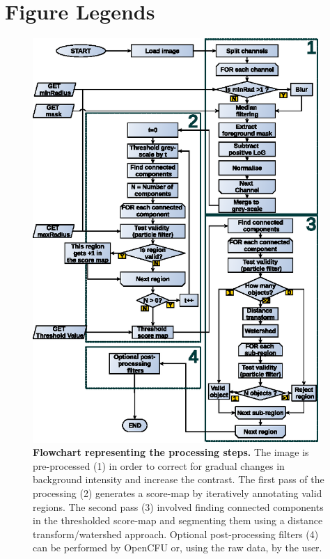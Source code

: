 \documentclass[10pt]{article}
\begin{document}
\section*{Figure Legends} 

\begin{figure}[!ht]
\begin{center}
\includegraphics[width=4.27in]{./figPipeline/figFlowChart.eps}
\end{center}
\caption{{\bf Flowchart representing the processing steps.}
The image is pre-processed (1) in order to correct for gradual
changes in background intensity and increase the contrast.
The first pass of the processing (2) generates a score-map by iteratively annotating valid regions.
The second pass (3) involved finding connected components in the thresholded score-map and segmenting them using a distance transform/watershed approach.
Optional post-processing filters (4) can be performed by OpenCFU or, using the raw data, by the user. 
}
\label{figFlowChart}
\end{figure}



\newpage{}
\end{document}
